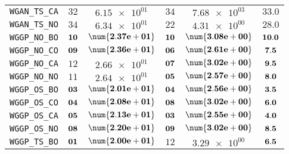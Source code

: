 \begin{table}[H]
\begin{tabularx}{\textwidth}{l||CC|CC||c}
		\texttt{WGAN\_TS\_CA} & $ 32$ & $ \num{6.15e+01}$ & $ 34$ & $ \num{7.68e+03}$ &$ 33.0$  \\
		\texttt{WGAN\_TS\_NO} & $ 34$ & $ \num{6.34e+01}$ & $ 22$ & $ \num{4.31e+00}$ &$ 28.0$  \\ \hline
		\texttt{WGGP\_NO\_BO} & $\bf 10$ & $\bf \num{2.37e+01}$ & $\bf 10$ & $\bf \num{3.08e+00}$ &$\bf 10.0$  \\
		\texttt{WGGP\_NO\_CO} & $\bf 09$ & $\bf \num{2.36e+01}$ & $\bf 06$ & $\bf \num{2.61e+00}$ &$\bf 7.5$  \\
		\texttt{WGGP\_NO\_CA} & $ 12$ & $ \num{2.66e+01}$ & $\bf 07$ & $\bf \num{3.02e+00}$ &$\bf 9.5$  \\
		\texttt{WGGP\_NO\_NO} & $ 11$ & $ \num{2.64e+01}$ & $\bf 05$ & $\bf \num{2.57e+00}$ &$\bf 8.0$  \\
		\texttt{WGGP\_OS\_BO} & $\bf 03$ & $\bf \num{2.01e+01}$ & $\bf 04$ & $\bf \num{2.56e+00}$ &$\bf 3.5$  \\
		\texttt{WGGP\_OS\_CO} & $\bf 04$ & $\bf \num{2.08e+01}$ & $\bf 08$ & $\bf \num{3.02e+00}$ &$\bf 6.0$  \\
		\texttt{WGGP\_OS\_CA} & $\bf 05$ & $\bf \num{2.13e+01}$ & $\bf 03$ & $\bf \num{2.55e+00}$ &$\bf 4.0$  \\
		\texttt{WGGP\_OS\_NO} & $\bf 08$ & $\bf \num{2.20e+01}$ & $\bf 09$ & $\bf \num{3.02e+00}$ &$\bf 8.5$  \\
		\texttt{WGGP\_TS\_BO} & $\bf 01$ & $\bf \num{2.00e+01}$ & $ 12$ & $ \num{3.29e+00}$ &$\bf 6.5$  \\

\end{tabularx}
\end{table}

